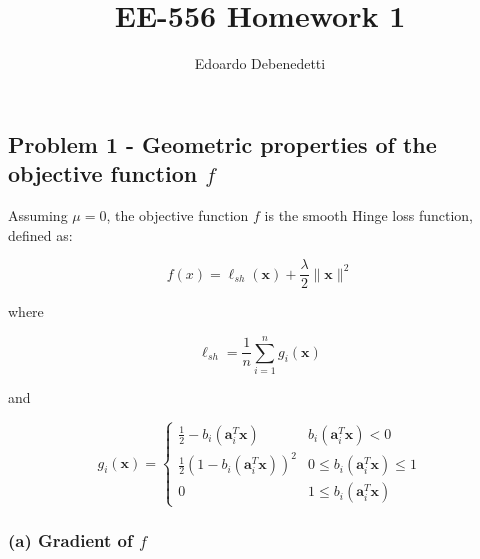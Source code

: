 \documentclass[12pt]{article}
\title{EE-556 Homework 1}
\author{Edoardo Debenedetti}
\newcommand{\xb}{\mathbf{x}}
\newcommand{\ab}{\mathbf{a}}
\newcommand{\abi}{\ab_i}
\newcommand{\xnorm}{\lVert \mathbf{\xb} \rVert}
\newcommand{\sumin}{\sum_{i = 1}^n}
\newcommand{\ellsh}{\ell_{sh}}
\newcommand{\ax}{\abi^T\xb}
\begin{document}
\maketitle

\vspace{0.5in}



\subsection*{Problem 1 - Geometric properties of the objective function $f$}

Assuming $\mu = 0$, the objective function $f$ is the smooth Hinge loss function, defined as:

\begin{equation} \label{def:hinge_loss}
    f(x) = \ellsh(\xb) + \frac{\lambda}{2} \xnorm ^ 2
\end{equation}

where

\begin{equation} \label{def:l}
    \ellsh = \frac{1}{n} \sumin g_i(\xb)
\end{equation}

and

\begin{equation}
    g_i(\xb) = \begin{cases} \label{def:g}
    \frac{1}{2} - b_i(\ax)         & b_i(\ax) < 0 \\
    \frac{1}{2}(1 - b_i(\ax))^2    & 0 \leq b_i(\ax) \leq 1 \\
    0                                   & 1 \le b_i(\ax)
\end{cases}
\end{equation}

\subsubsection*{(a) Gradient of $f$}
\end{document}
